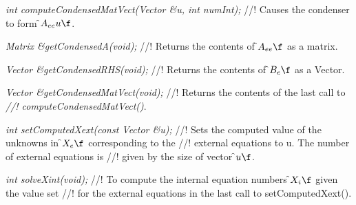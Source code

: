 {\em int computeCondensedMatVect(Vector \&u, int numInt);}
//! Causes the condenser to form \f$A_{ee} u\f$.

{\em Matrix \&getCondensedA(void);}
//! Returns the contents of \f$A_{ee}\f$ as a matrix.

{\em Vector \&getCondensedRHS(void);}
//! Returns the contents of \f$B_e\f$ as a Vector.

{\em Vector \&getCondensedMatVect(void);}
//! Returns the contents of the last call to {\em
//! computeCondensedMatVect()}.

{\em int setComputedXext(const Vector \&u);}
//! Sets the computed value of the unknowns in \f$X_e\f$ corresponding to the
//! external equations to \p u. The number of external equations is
//! given by the size of vector \f$u\f$.

{\em  int solveXint(void);}
//! To compute the internal equation numbers \f$X_i\f$ given the value set
//! for the external equations in the last call to setComputedXext().


